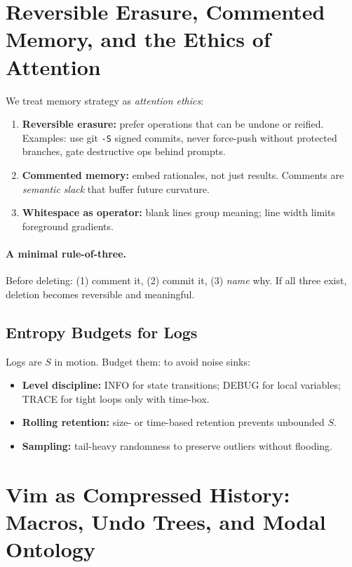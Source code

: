 \documentclass[12pt,a4paper]{article}
\theoremstyle{plain}
\theoremstyle{definition}
\theoremstyle{remark}
\newcommand{\Sfield}{S}
\begin{document}
\section{Reversible Erasure, Commented Memory, and the Ethics of Attention}
\label{sec:reversible-erasure}

We treat memory strategy as \emph{attention ethics}:
\begin{enumerate}
  \item \textbf{Reversible erasure:} prefer operations that can be undone or reified. Examples: use git \verb|-S| signed commits, never force-push without protected branches, gate destructive ops behind prompts.
  \item \textbf{Commented memory:} embed rationales, not just results. Comments are \emph{semantic slack} that buffer future curvature.
  \item \textbf{Whitespace as operator:} blank lines group meaning; line width limits foreground gradients.
\end{enumerate}

\paragraph{A minimal rule-of-three.}
Before deleting: (1) comment it, (2) commit it, (3) \emph{name} why. If all three exist, deletion becomes reversible and meaningful.

\subsection{Entropy Budgets for Logs}
Logs are $\Sfield$ in motion. Budget them:
 to avoid noise sinks:
\begin{itemize}
  \item \textbf{Level discipline:} INFO for state transitions; DEBUG for local variables; TRACE for tight loops only with time-box.
  \item \textbf{Rolling retention:} size- or time-based retention prevents unbounded $\Sfield$.
  \item \textbf{Sampling:} tail-heavy randomness to preserve outliers without flooding.
\end{itemize}

\section{Vim as Compressed History: Macros, Undo Trees, and Modal Ontology}
\label{sec:vim-compressed-history}
\end{document}
